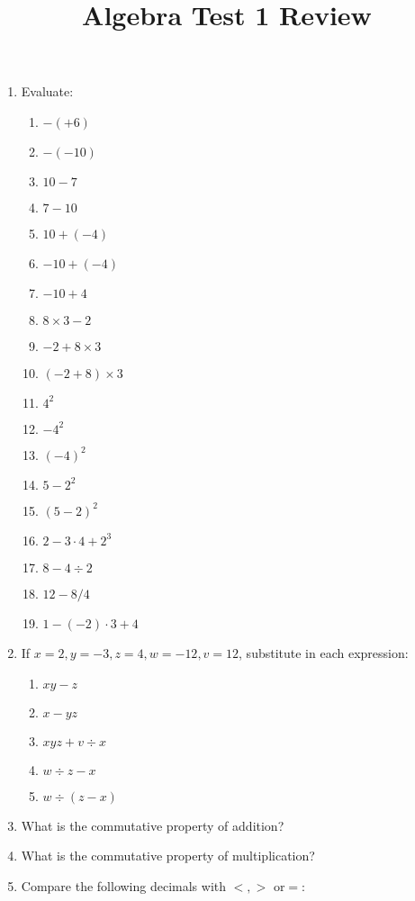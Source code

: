 \documentclass{article}
\title{Algebra Test 1 Review}
\begin{document}
{}
\begin{multicols}{2}
\begin{enumerate}
	\item Evaluate:
	\begin{enumerate}
		\item $-(+6)$
		\item $-(-10)$
		\item $10-7$
		\item $7-10$
		\item $10 + (-4)$
		\item $-10 + (-4)$
		\item $-10 + 4$
		\item $8 \times 3 - 2$
		\item $-2 + 8 \times 3$
		\item $(-2 + 8) \times 3$
		\item $4^2$
		\item $-4^2$
		\item $(-4)^2$
		\item $5-2^2$
		\item $(5-2)^2$
		\item $2-3\cdot 4 + 2^3$
		\item $8 - 4 \div 2$
		\item $12 - 8 / 4$
		\item $1-(-2)\cdot 3 + 4$
	\end{enumerate}
	\item If $x=2, y=-3, z=4, w=-12, v=12$, substitute in each expression:
	\begin{enumerate}
		\item $xy - z$
		\item $x - yz$
		\item $xyz + v \div x$
		\item $w \div z - x$
		\item $w \div (z-x)$
	\end{enumerate}
	\item What is the commutative property of addition?
	\item What is the commutative property of multiplication?
	\item Compare the following decimals with $<, >$ or$ =$:

\end{enumerate}
\end{multicols}
\end{document}
